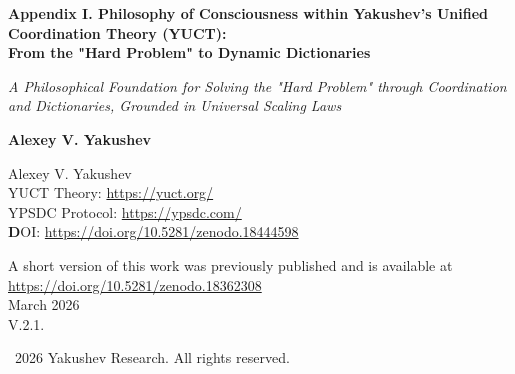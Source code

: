 \documentclass[12pt,a4paper]{article}
\begin{document}
	
	\begin{titlepage}
		\begin{center}
			\vspace*{0cm}
			
			\Huge\textbf{Appendix I. Philosophy of Consciousness within Yakushev's Unified Coordination Theory (YUCT):\\ From the "Hard Problem" to Dynamic Dictionaries}
			
			\vspace{1cm}
			
			\small\textit{A Philosophical Foundation for Solving the "Hard Problem" through Coordination and Dictionaries, Grounded in Universal Scaling Laws}
			
			\vspace{0.5cm}
			
			\small\textbf{Alexey V. Yakushev}
			
			\vspace{0.5cm}
			\Large
			Alexey V. Yakushev\\
			
			YUCT Theory: \url{https://yuct.org/}\\
			YPSDC Protocol: \url{https://ypsdc.com/}\\
			
			
			\vspace{1cm}
			\textbf DOI: \url{https://doi.org/10.5281/zenodo.18444598}\\
			
			\vspace{0.5cm}
			
			\vspace{0cm}
			\large 
			A short version of this work was previously published and is available at\\ \url{https://doi.org/10.5281/zenodo.18362308}\\
			\vspace{1cm}
			March 2026 \\ \large V.2.1.
			
			\vspace{4cm}
			\textcopyright~2026 Yakushev Research. All rights reserved.
			
			\newpage
			
			\begin{abstract}
				\noindent
				This article provides a philosophical foundation for solving the "hard problem of consciousness" within the framework of the Unified Coordination Theory (YUCT). Consciousness is understood not as an epiphenomenon or illusion, but as a \textbf{dynamic coordination process} implemented through a hierarchy of \textbf{internal dictionaries}. We show that the classical "brain–consciousness" dualism is overcome through a three-level model: \textbf{genetic}, \textbf{neural}, and \textbf{cultural dictionaries}. Subjective experience is interpreted as the result of \textbf{live coordination} between neural ensembles using shared semantic spaces. The meta-dictionary (the ability to reflect on one's own states) explains the phenomenon of selfhood. 
				

\end{abstract}
\end{center}
\end{titlepage}
\end{document}

